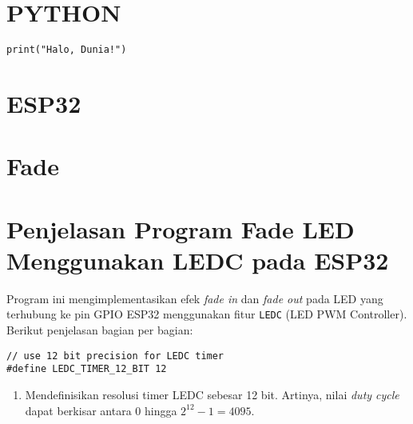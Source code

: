 \section{PYTHON}
\begin{minipage}{0.99\linewidth}
    \begin{lstlisting}[style=PythonStyle,caption={Python Minimalis},label={lst:python-simple}]
        print("Halo, Dunia!")
    \end{lstlisting}
\end{minipage}

\section{ESP32}
\begin{minipage}{0.99\linewidth}
    
\end{minipage}


\section{Fade}
\begin{minipage}{0.99\linewidth}
    
\end{minipage}

\section{Penjelasan Program Fade LED Menggunakan LEDC pada ESP32}

Program ini mengimplementasikan efek \textit{fade in} dan \textit{fade out} pada LED yang terhubung ke pin GPIO ESP32 menggunakan fitur \texttt{LEDC} (LED PWM Controller). Berikut penjelasan bagian per bagian:

\begin{verbatim}
// use 12 bit precision for LEDC timer
#define LEDC_TIMER_12_BIT 12
\end{verbatim}
\begin{enumerate}
    \item Mendefinisikan resolusi timer LEDC sebesar 12 bit. Artinya, nilai \textit{duty cycle} dapat berkisar antara 0 hingga \(2^{12} - 1 = 4095\).
\end{enumerate}

